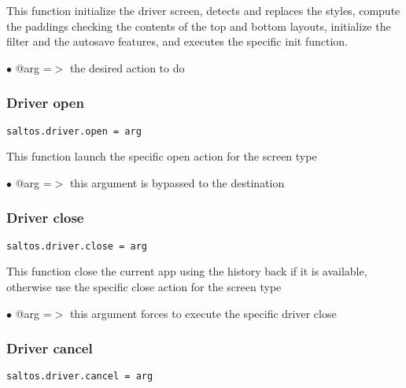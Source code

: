 \documentclass[a4paper]{article}
\begin{document}
This function initialize the driver screen, detects and replaces the styles, compute
the paddings checking the contents of the top and bottom layouts, initialize the filter
and the autosave features, and executes the specific init function.

\begin{compactitem}
\item[\color{myblue}$\bullet$] @arg =$>$ the desired action to do
\end{compactitem}

\hypertarget{toc726}{}
\subsubsection{Driver open}

\begin{lstlisting}
saltos.driver.open = arg
\end{lstlisting}

This function launch the specific open action for the screen type

\begin{compactitem}
\item[\color{myblue}$\bullet$] @arg =$>$ this argument is bypassed to the destination
\end{compactitem}

\hypertarget{toc727}{}
\subsubsection{Driver close}

\begin{lstlisting}
saltos.driver.close = arg
\end{lstlisting}

This function close the current app using the history back if it is available,
otherwise use the specific close action for the screen type

\begin{compactitem}
\item[\color{myblue}$\bullet$] @arg =$>$ this argument forces to execute the specific driver close
\end{compactitem}

\hypertarget{toc728}{}
\subsubsection{Driver cancel}

\begin{lstlisting}
saltos.driver.cancel = arg
\end{lstlisting}
\end{document}
